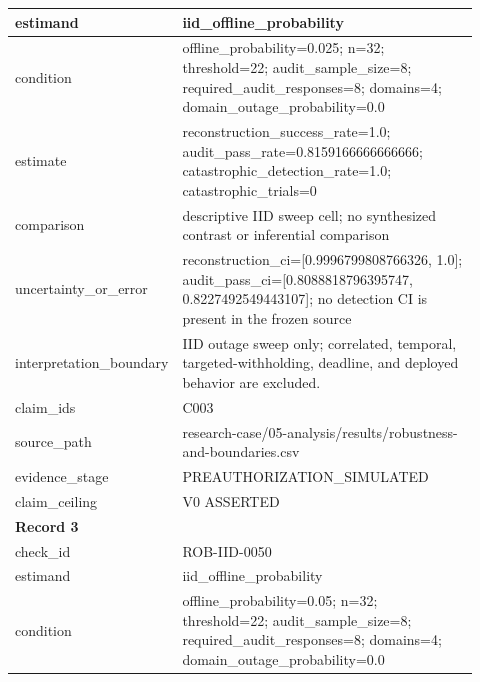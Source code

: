 \begin{longtable}{|p{0.24\linewidth}|p{0.68\linewidth}|}
estimand & iid\_\allowbreak{}offline\_\allowbreak{}probability \\ \hline
condition & offline\_\allowbreak{}probability=0.025;\allowbreak{} n=32;\allowbreak{} threshold=22;\allowbreak{} audit\_\allowbreak{}sample\_\allowbreak{}size=8;\allowbreak{} required\_\allowbreak{}audit\_\allowbreak{}responses=8;\allowbreak{} domains=4;\allowbreak{} domain\_\allowbreak{}outage\_\allowbreak{}probability=0.0 \\ \hline
estimate & reconstruction\_\allowbreak{}success\_\allowbreak{}rate=1.0;\allowbreak{} audit\_\allowbreak{}pass\_\allowbreak{}rate=0.8159166666666666;\allowbreak{} catastrophic\_\allowbreak{}detection\_\allowbreak{}rate=1.0;\allowbreak{} catastrophic\_\allowbreak{}trials=0 \\ \hline
comparison & descriptive IID sweep cell;\allowbreak{} no synthesized contrast or inferential comparison \\ \hline
uncertainty\_\allowbreak{}or\_\allowbreak{}error & reconstruction\_\allowbreak{}ci=[0.9996799808766326, 1.0];\allowbreak{} audit\_\allowbreak{}pass\_\allowbreak{}ci=[0.8088818796395747, 0.8227492549443107];\allowbreak{} no detection CI is present in the frozen source \\ \hline
interpretation\_\allowbreak{}boundary & IID outage sweep only;\allowbreak{} correlated, temporal, targeted-withholding, deadline, and deployed behavior are excluded. \\ \hline
claim\_\allowbreak{}ids & C003 \\ \hline
source\_\allowbreak{}path & research-case/05-analysis/results/robustness-and-boundaries.csv \\ \hline
evidence\_\allowbreak{}stage & PREAUTHORIZATION\_\allowbreak{}SIMULATED \\ \hline
claim\_\allowbreak{}ceiling & V0 ASSERTED \\ \hline
\multicolumn{2}{|l|}{\textbf{Record 3}} \\ \hline
check\_\allowbreak{}id & ROB-IID-0050 \\ \hline
estimand & iid\_\allowbreak{}offline\_\allowbreak{}probability \\ \hline
condition & offline\_\allowbreak{}probability=0.05;\allowbreak{} n=32;\allowbreak{} threshold=22;\allowbreak{} audit\_\allowbreak{}sample\_\allowbreak{}size=8;\allowbreak{} required\_\allowbreak{}audit\_\allowbreak{}responses=8;\allowbreak{} domains=4;\allowbreak{} domain\_\allowbreak{}outage\_\allowbreak{}probability=0.0 \\ \hline

\end{longtable}
